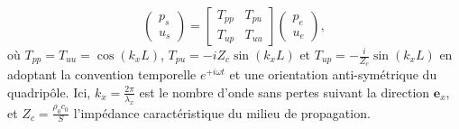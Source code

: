 

\begin{equation}
    \begin{pmatrix}
        p_s\\
        u_s
    \end{pmatrix}=\begin{bmatrix}
        T_{pp} & T_{pu} \\
        T_{up} & T_{uu}
    \end{bmatrix}\begin{pmatrix}
        p_e\\
        u_e
    \end{pmatrix},
    \label{eq:TMatrix_TppTuu}
\end{equation}
où $T_{pp}=T_{uu}=\cos(k_x L)$, $T_{pu}=-i Z_c \sin(k_x L)$ et $T_{up}=-\frac{i}{Z_c}\sin(k_x L)$ en adoptant la convention temporelle $e^{+i\omega t}$ et une orientation anti-symétrique du quadripôle. Ici, $k_x = \frac{2\pi}{\lambda_x}$ est le nombre d'onde sans pertes suivant la direction $\mathbf e_x$, et $Z_c = \frac{\rho_0 c_0}{S}$ l'impédance caractéristique du milieu de propagation. 

